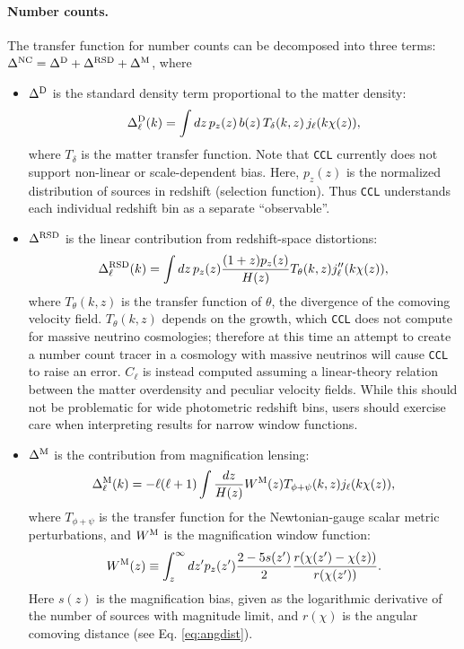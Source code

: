 \documentclass[\docopts]{\docclass}
\newcommand{\ccl}{{\tt CCL}\xspace}
\begin{document}
\paragraph{\bf Number counts.} The transfer function for number counts can be decomposed into three terms: $\Delta^{\rm NC}=\Delta^{\rm D}+\Delta^{\rm RSD}+\Delta^{\rm M}$, where
\begin{itemize}
  \item $\Delta^{\rm D}$ is the standard density term proportional to the matter density:
        \begin{equation}
          \Delta^{\rm D}_\ell(k)=\int dz\,p_z(z)\,b(z)\,T_\delta(k,z)\,j_\ell(k\chi(z)),
        \end{equation}
        where $T_\delta$ is the matter transfer function. Note that \ccl currently does not support non-linear or scale-dependent bias. Here, $p_z(z)$ is the normalized distribution of sources in redshift (selection function). Thus \ccl understands each individual redshift bin as a separate ``observable''.
  \item $\Delta^{\rm RSD}$ is the linear contribution from redshift-space distortions:
        \begin{equation}
          \Delta^{\rm RSD}_\ell(k)=\int dz\,p_z(z)\frac{(1+z) p_z(z)}{H(z)}T_\theta(k,z) j_\ell''(k\chi(z)),
        \end{equation}
        where $T_\theta(k,z)$ is the transfer function of $\theta$, the divergence of the comoving velocity field. $T_\theta(k,z)$ depends on the growth, which \ccl does not compute for massive neutrino cosmologies; therefore at this time an attempt to create a number count tracer in a cosmology with massive neutrinos will cause \ccl to raise an error. $C_\ell$ is instead computed assuming a linear-theory relation between the matter overdensity and peculiar velocity fields. While this should not be problematic for wide photometric redshift bins, users should exercise care when interpreting results for narrow window functions. 
  \item $\Delta^{\rm M}$ is the contribution from magnification lensing:
        \begin{equation}
          \Delta_\ell^{\rm M}(k)=-\ell(\ell+1)\int \frac{dz}{H(z)} W^{\rm M}(z) T_{\phi+\psi}(k,z) j_\ell(k\chi(z)),
          \label{eq:deltaM}
        \end{equation}
        where $T_{\phi+\psi}$ is the transfer function for the Newtonian-gauge scalar metric perturbations, and $W^{\rm M}$ is the magnification window function:
        \begin{equation}
           W^{\rm M}(z)\equiv\int_z^\infty dz' p_z(z')\frac{2-5s(z')}{2}\frac{r(\chi(z')-\chi(z))}{r(\chi(z'))}.
        \end{equation}
        Here $s(z)$ is the magnification bias, given as the logarithmic derivative of the number of sources with magnitude limit, and $r(\chi)$ is the angular comoving distance (see Eq. \ref{eq:angdist}).


\end{itemize}
\end{document}
